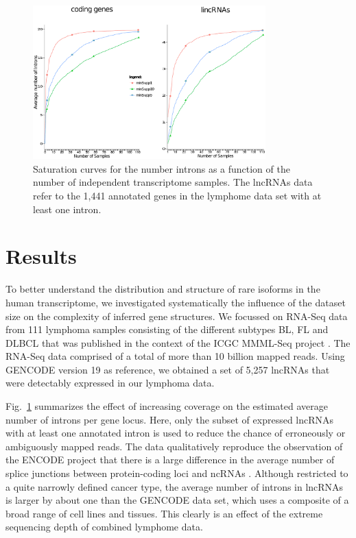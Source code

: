 \documentclass[ncrna,article,submit,moreauthors,pdftex,10pt,a4paper]{mdpi}
\begin{document}
\begin{figure}[t]
\begin{center}
  \includegraphics[width=0.8\textwidth]{saturation}
\end{center}
\caption{Saturation curves for the number introns as a function of the 
  number of independent transcriptome samples. The lncRNAs data refer to the 1,441 annotated  genes in the lymphome data set with at least one intron. 
  }
  \label{fig:saturation} 
\end{figure}

\section{Results}

To better understand the distribution and structure of rare isoforms in
the human transcriptome, we investigated systematically the influence of the
dataset size on the complexity of inferred gene structures. We focussed on
RNA-Seq data from 111 lymphoma samples consisting of the different subtypes
BL, FL and DLBCL that was published in the context of the ICGC MMML-Seq
project \cite{Richter:12a}. The RNA-Seq data comprised of a total of more
than 10 billion mapped reads. Using GENCODE version 19 as reference, we
obtained a set of 5,257 lncRNAs that were detectably expressed in our
lymphoma data.

Fig.~\ref{fig:saturation} summarizes the effect of increasing coverage on
the estimated average number of introns per gene locus. Here, only the
subset of expressed lncRNAs with at least one annotated intron is used to
reduce the chance of erroneously or ambiguously mapped reads. The data
qualitatively reproduce the observation of the ENCODE project that there
is a large difference in the average number of splice junctions between
protein-coding loci and ncRNAs \cite{Derrien:12}. Although restricted to a
quite narrowly defined cancer type, the average number of introns in
lncRNAs is larger by about one than the GENCODE data set, which uses a
composite of a broad range of cell lines and tissues. This clearly is an
effect of the extreme sequencing depth of combined lymphome data. 
\end{document}
